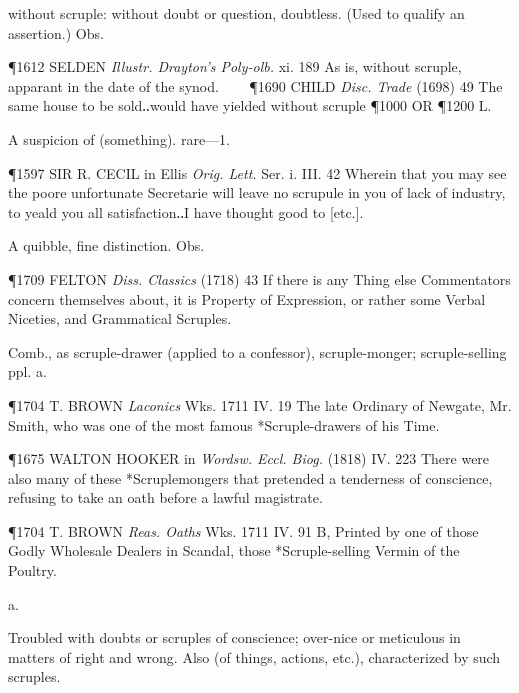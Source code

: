 \begin{description}[wide, labelwidth=!, labelindent=0pt]
\begin{myenumerate}
 without scruple: without doubt or question, doubtless. (Used to qualify an assertion.) Obs.

\P 1612 SELDEN  \textit{Illustr. Drayton's Poly-olb.} xi. 189 As is, without scruple, apparant in the date of the synod.    
\P 1690 CHILD  \textit{Disc. Trade} (1698) 49 The same house to be sold‥would have yielded without scruple
\P 1000 OR
\P 1200 L.

 A suspicion of (something). rare—1.

\P 1597 SIR R. CECIL  in Ellis \textit{Orig. Lett.} Ser. i. III. 42 Wherein that you may see the poore unfortunate Secretarie will leave no scrupule in you of lack of industry, to yeald you all satisfaction‥I have thought good to [etc.].

 A quibble, fine distinction. Obs.

\P 1709 FELTON  \textit{Diss. Classics} (1718) 43 If there is any Thing else Commentators concern themselves about, it is Property of Expression, or rather some Verbal Niceties, and Grammatical Scruples.

 Comb., as scruple-drawer (applied to a confessor), scruple-monger; scruple-selling ppl. a.

\P 1704 T. BROWN  \textit{Laconics} Wks. 1711 IV. 19 The  late Ordinary of Newgate, Mr. Smith, who was one of the most famous *Scruple-drawers of his Time.

\P 1675 WALTON HOOKER in  \textit{Wordsw. Eccl. Biog.} (1818) IV. 223 There were also many of these *Scruplemongers that pretended a tenderness of conscience, refusing to take an oath before a lawful magistrate.

\P 1704 T. BROWN  \textit{Reas. Oaths} Wks. 1711 IV. 91 B,  Printed by one of those Godly Wholesale Dealers in Scandal, those *Scruple-selling Vermin of the Poultry.
\end{myenumerate}


 a.

\noindent {}

\vspace{-0.3cm}

\begin{myenumerate}

 Troubled with doubts or scruples of conscience; over-nice or meticulous in matters of right and wrong. Also (of things, actions, etc.), characterized by such scruples.


\end{myenumerate}
\end{description}
